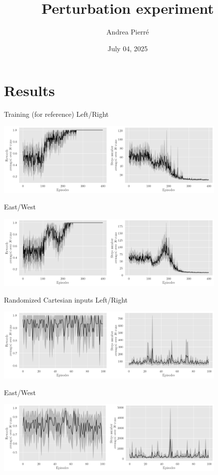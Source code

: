 \documentclass[bigger]{beamer}
\author{Andrea Pierré}
\date{July 04, 2025}
\title{Perturbation experiment}
\begin{document}
\maketitle
\section{Results}
\label{sec:org8890637}
\begin{frame}[label={sec:org7e81bcb}]{Training (for reference)}
\centering
Left/Right
\begin{center}
\includegraphics[width=0.85\textwidth]{medias/LeftRight/training.png}
\end{center}

East/West
\begin{center}
\includegraphics[width=0.85\textwidth]{medias/EastWest/training.png}
\end{center}
\end{frame}
\begin{frame}[label={sec:orgd9631a1}]{Randomized Cartesian inputs}
\centering
Left/Right
\begin{center}
\includegraphics[width=0.85\textwidth]{medias/LeftRight/exp_keep-polar_silence-False.png}
\end{center}

East/West
\begin{center}
\includegraphics[width=0.85\textwidth]{medias/EastWest/exp_keep-polar_silence-False.png}
\end{center}
\end{frame}
\end{document}
